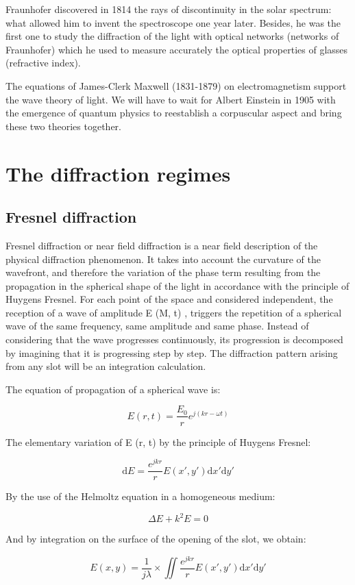\documentclass[10pt,a4paper]{article}
\begin{document}
Fraunhofer discovered in 1814 the rays of discontinuity in the solar spectrum: what allowed him to invent the spectroscope one year later. Besides, he was the first one to study the diffraction of the light with optical networks (networks of Fraunhofer) which he used to measure accurately the optical properties of glasses (refractive index). 

The equations of James-Clerk Maxwell (1831-1879) on electromagnetism support the wave theory of light. We will have to wait for Albert Einstein in 1905 with the emergence of quantum physics to reestablish a corpuscular aspect and bring these two theories together.

\section{The diffraction regimes}
	\subsection{Fresnel diffraction}
Fresnel diffraction or near field diffraction is a near field description of the physical diffraction phenomenon. It takes into account the curvature of the wavefront, and therefore the variation of the phase term resulting from the propagation in the spherical shape of the light in accordance with the principle of Huygens Fresnel. For each point of the space and considered independent, the reception of a wave of amplitude E (M, t) , triggers the repetition of a spherical wave of the same frequency, same amplitude and same phase. Instead of considering that the wave progresses continuously, its progression is decomposed by imagining that it is progressing step by step. The diffraction pattern arising from any slot will be an integration calculation. 

The equation of propagation of a spherical wave is:

\[E(r,t)= \frac{E_0}{r} e^{j(kr-\omega t)}\]

The elementary variation of E (r, t) by the principle of Huygens Fresnel:

\[\mathrm{d}E=\frac{e^{jkr}}{r} E(x',y') \mathrm{d}x' \mathrm{d}y'\]

By the use of the Helmoltz equation in a homogeneous medium: 

\[\Delta E+k^2 E=0\]

And by integration on the surface of the opening of the slot, we obtain:

\[
E(x,y)=\frac{1}{j\lambda}
\times \iint \frac{e^{jkr}}{r}
E(x',y')\mathrm{d}x'\mathrm{d}y'
\]
\end{document}
